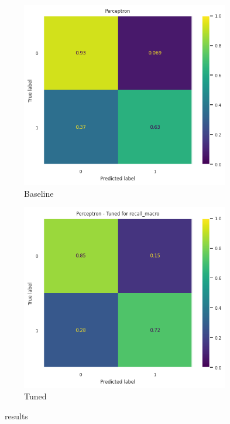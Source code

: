 \begin{frame}{\subsecname}
\begin{figure}
    \centering
    \begin{subfigure}[c]{0.4\textwidth}
        \includegraphics[width=\textwidth]{images/models/Percep_base.png}
        \caption{Baseline}
    \end{subfigure}
    \begin{subfigure}[c]{0.4\textwidth}
        \includegraphics[width=\textwidth]{images/models/Percep_tuned.png}
        \caption{Tuned}
    \end{subfigure}
    \caption{\subsecname\ results}
\end{figure}
\end{frame}

